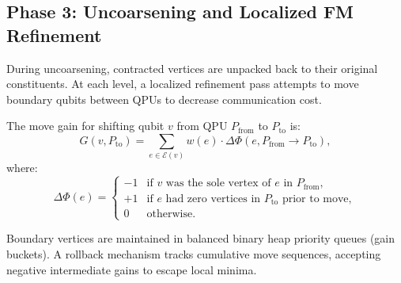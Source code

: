 \subsection{Phase 3: Uncoarsening and Localized FM Refinement}
During uncoarsening, contracted vertices are unpacked back to their original constituents. At each level, a localized  refinement pass attempts to move boundary qubits between QPUs to decrease communication cost.

The move gain for shifting qubit $v$ from QPU $P_{\text{from}}$ to $P_{\text{to}}$ is:
\begin{equation}
    G(v, P_{\text{to}}) = \sum_{e \in \mathcal{E}(v)} w(e) \cdot \Delta \Phi(e, P_{\text{from}} \to P_{\text{to}}),
    \label{eq:fm_gain_formula}
\end{equation}
where:
\begin{equation}
    \Delta \Phi(e) = \begin{cases}
        -1 & \text{if } v \text{ was the sole vertex of } e \text{ in } P_{\text{from}}, \\
        +1 & \text{if } e \text{ had zero vertices in } P_{\text{to}} \text{ prior to move}, \\
        0 & \text{otherwise.}
    \end{cases}
\end{equation}

Boundary vertices are maintained in balanced binary heap priority queues (gain buckets). A rollback mechanism tracks cumulative move sequences, accepting negative intermediate gains to escape local minima.


